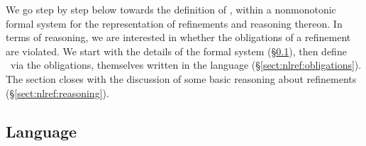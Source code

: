 \documentclass[10pt, conference, compsocconf]{IEEEtran}
\begin{document}
We go step by step below towards the definition of \nlref, within a nonmonotonic formal system for the representation of refinements and reasoning thereon. In terms of reasoning, we are interested in whether the obligations of a refinement are violated. We start with the details of the formal system (\S\ref{sect:nlref:language}), then define \nlref\ via the obligations, themselves written in the language (\S\ref{sect:nlref:obligations}). The section closes with the discussion of some basic reasoning about refinements (\S\ref{sect:nlref:reasoning}).


\subsection{Language}\label{sect:nlref:language}
\end{document}
